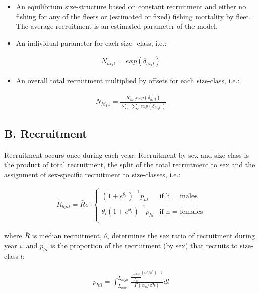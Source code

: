 \documentclass[]{article}
\providecommand{\tightlist}{%
  \setlength{\itemsep}{0pt}\setlength{\parskip}{0pt}}
\begin{document}
\begin{itemize}
\item
  An equilibrium size-structure based on constant recruitment and either
  no fishing for any of the fleets or (estimated or fixed) fishing
  mortality by fleet. The average recruitment is an estimated parameter
  of the model.
\item
  An individual parameter for each size- class, i.e.:
\end{itemize}

\begin{align}
 N_{hi_{1}1} = exp(\delta_{hi_{1}l})
\end{align}

\begin{itemize}
\tightlist
\item
  An overall total recruitment multiplied by offsets for each
  size-class, i.e.:
\end{itemize}

\begin{align}
 N_{hi_{1}1} = \frac {R_{init}exp(\delta_{hi_{1}l})} {\sum_{h'} \sum_{l'} {exp(\delta_{hi_{1}l'})}}
\end{align}

\subsection{B. Recruitment}\label{b.-recruitment}

Recruitment occurs once during each year. Recruitment by sex and
size-class is the product of total recruitment, the split of the total
recruitment to sex and the assignment of sex-specific recruitment to
size-classes, i.e.:

\begin{align}
 \widetilde{R}_{hjil} =  \bar{R} e^{\epsilon_{i}}
  \begin{cases}
    (1 + e^{\theta_{i}})^{-1} p_{hl} & \text{if h = males} \\[2ex]
    \theta_{i} (1 + e^{\theta_{i}})^{-1} p_{hl} & \text{if h = females} \\
    \end{cases}
    \end{align}

where \(\bar{R}\) is median recruitment, \(\theta_{i}\) determines the
sex ratio of recruitment during year \(i\), and \(p_{hl}\) is the
proportion of the recruitment (by sex) that recruits to size-class
\(l\):

\begin{align}
 p_{hil} = \int_{L_{low}}^{L_{high}} \frac {\frac{le^{-l/\beta_{h}}}{\beta_{h}}^{(\alpha^{h}/\beta^{h})-1}}{\Gamma(\alpha_{h}/\beta{h})} dl
\end{align}
\end{document}
